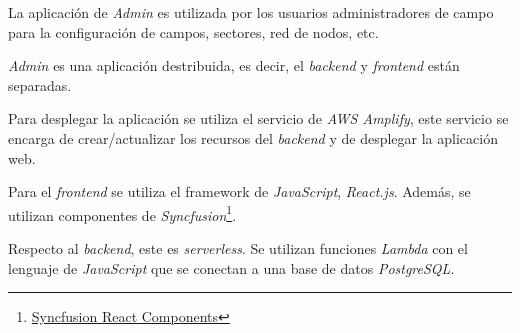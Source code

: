 La aplicación de \textit{Admin} es utilizada por los usuarios administradores de campo para la configuración de campos, sectores, red de nodos, etc.

\textit{Admin} es una aplicación destribuida, es decir, el \textit{backend} y \textit{frontend} están separadas. 

Para desplegar la aplicación se utiliza el servicio de \textit{AWS Amplify}, este servicio se encarga de crear/actualizar los recursos del \textit{backend} y de desplegar la aplicación web.

Para el \textit{frontend} se utiliza el framework de \textit{JavaScript}, \textit{React.js}. Además, se utilizan componentes de \textit{Syncfusion}\footnote{\href{https://www.syncfusion.com/react-components}{Syncfusion React Components}}.

Respecto al \textit{backend}, este es \textit{serverless}. Se utilizan funciones \textit{Lambda} con el lenguaje de \textit{JavaScript} que se conectan a una base de datos \textit{PostgreSQL}.